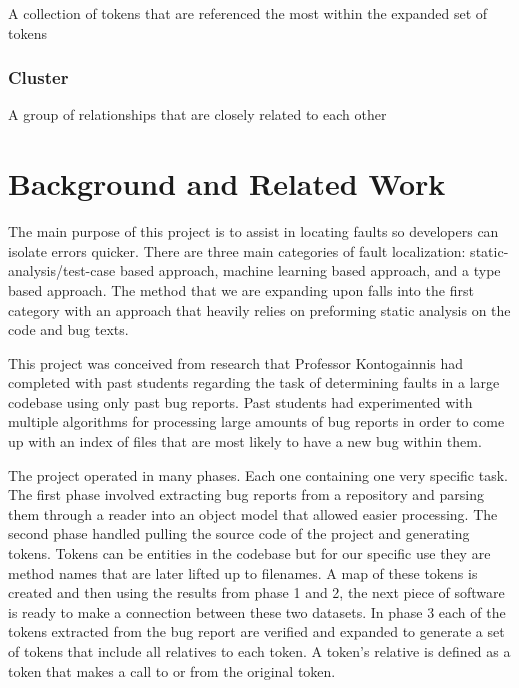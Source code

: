 \documentclass[12pt]{article}
\begin{document}
A collection of tokens that are referenced the most within the expanded
set of tokens

\subsubsection{Cluster}\label{cluster}

A group of relationships that are closely related to each other

\section{Background and Related Work}\label{background-and-related-work}

The main purpose of this project is to assist in locating faults so
developers can isolate errors quicker. There are three main categories
of fault localization: static-analysis/test-case based approach, machine
learning based approach, and a type based approach. The method that we
are expanding upon falls into the first category with an approach that
heavily relies on preforming static analysis on the code and bug texts.

This project was conceived from research that Professor Kontogainnis had
completed with past students regarding the task of determining faults in
a large codebase using only past bug reports. Past students had
experimented with multiple algorithms for processing large amounts of
bug reports in order to come up with an index of files that are most
likely to have a new bug within them.

The project operated in many phases. Each one containing one very
specific task. The first phase involved extracting bug reports from a
repository and parsing them through a reader into an object model that
allowed easier processing. The second phase handled pulling the source
code of the project and generating tokens. Tokens can be entities in the
codebase but for our specific use they are method names that are later
lifted up to filenames. A map of these tokens is created and then using
the results from phase 1 and 2, the next piece of software is ready to
make a connection between these two datasets. In phase 3 each of the
tokens extracted from the bug report are verified and expanded to
generate a set of tokens that include all relatives to each token. A
token's relative is defined as a token that makes a call to or from the
original token.
\end{document}
